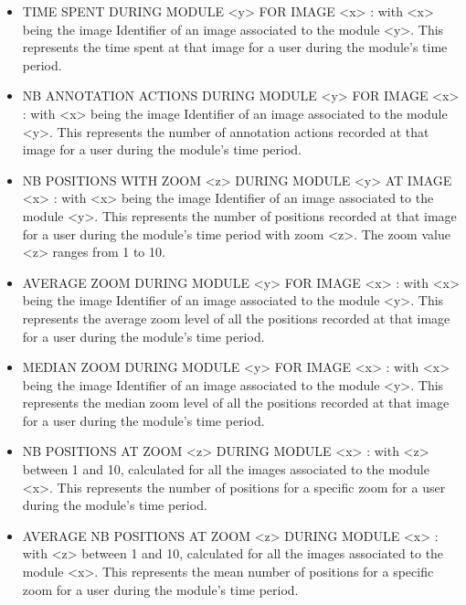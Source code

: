 \documentclass[a4paper,11pt]{report}
\numberwithin{figure}{section} %
\begin{document}
\begin{itemize}
    \item[\textbullet] TIME SPENT DURING MODULE <y> FOR IMAGE <x> : with <x> being the image Identifier of an image associated to the module <y>.
    This represents the time spent at that image for a user during the module's time period. \\
    
    \item[\textbullet] NB ANNOTATION ACTIONS DURING MODULE <y> FOR IMAGE <x> : with <x> being the image Identifier of an image associated to the module <y>.
    This represents the number of annotation actions recorded at that image for a user during the module's time period. \\
     
     
     \item[\textbullet] NB POSITIONS WITH ZOOM <z> DURING MODULE <y> AT IMAGE <x> : with <x> being the image Identifier of an image associated to the module <y>.
     This represents the number of positions recorded at that image for a user during the module's time period with zoom <z>.
     The zoom value <z> ranges from 1 to 10. \\
     
     \item[\textbullet] AVERAGE ZOOM DURING MODULE <y> FOR IMAGE <x> : with <x> being the image Identifier of an image associated to the module <y>.
     This represents the average zoom level of all the positions recorded at that image for a user during the module's time period. \\
     
     \item[\textbullet] MEDIAN ZOOM DURING MODULE <y> FOR IMAGE <x> : with <x> being the image Identifier of an image associated to the module <y>.
     This represents the median zoom level of all the positions recorded at that image for a user during the module's time period. \\
     
     \item[\textbullet] NB POSITIONS AT ZOOM <z> DURING MODULE <x> : with <z> between 1 and 10, calculated for all the images associated to the module <x>.
     This represents the number of positions for a specific zoom for a user during the module's time period. \\
     
	\item[\textbullet] AVERAGE NB POSITIONS AT ZOOM <z> DURING MODULE <x> : with <z> between 1 and 10, calculated for all the images associated to the module <x>.
	This represents the mean number of positions for a specific zoom for a user during the module's time period. \\


\end{itemize}
\end{document}
